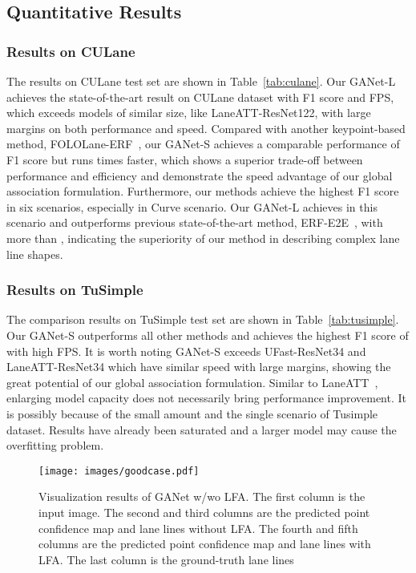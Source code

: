 \documentclass[10pt,twocolumn,letterpaper]{article}
\begin{document}
\subsection{Quantitative Results}

\subsubsection{Results on CULane}
The results on CULane test set are shown in Table~\ref{tab:culane}. Our GANet-L achieves the state-of-the-art result on CULane dataset with  F1 score and  FPS, which exceeds models of similar size, like LaneATT-ResNet122, with large margins on both performance and speed.
Compared with another keypoint-based method, FOLOLane-ERF~\cite{Qu_2021_CVPR}, our GANet-S achieves a comparable performance of  F1 score but runs  times faster, which shows a superior trade-off between performance and efficiency and demonstrate the speed advantage of our global association formulation.
Furthermore, our methods achieve the highest F1 score in six scenarios, especially in Curve scenario.
Our GANet-L achieves  in this scenario and outperforms previous state-of-the-art method, ERF-E2E~\cite{yoo2020end}, with more than , indicating the superiority of our method in describing complex lane line shapes.

\subsubsection{Results on TuSimple}

The comparison results on TuSimple test set are shown in Table~\ref{tab:tusimple}. Our GANet-S outperforms all other methods and achieves the highest F1 score of  with high FPS. 
It is worth noting GANet-S exceeds UFast-ResNet34 and LaneATT-ResNet34 which have similar speed with large margins, showing the great potential of our global association formulation.
Similar to LaneATT~\cite{Tabelini_2021_CVPR}, enlarging model capacity does not necessarily bring performance improvement. It is possibly because of the small amount and the single scenario of Tusimple dataset. Results have already been saturated and a larger model may cause the overfitting problem. 

\begin{figure*}[!t]
    \centering
    \texttt{[image: images/goodcase.pdf]}
    \caption{Visualization results of GANet w/wo LFA. The first column is the input image. The second and third columns are the predicted point confidence map and lane lines without LFA. The fourth and fifth columns are the predicted point confidence map and lane lines with LFA. The last column is the ground-truth lane lines}
    \label{fig:LFAmodule}
\end{figure*}
\end{document}
